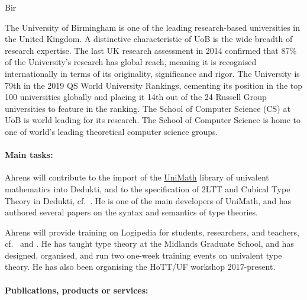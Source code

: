 \begin{sitedescription}{Bir}


The University of Birmingham is one of the leading research-based universities in the United Kingdom. A distinctive
characteristic of UoB is the wide breadth of research expertise. The last UK research assessment in 2014 confirmed that
87\% of the University’s research has global reach, meaning it is recognised internationally in terms of its originality, significance and rigor. The University is 79th in the 2019 QS World University Rankings, cementing its position in the top 100 universities globally and placing it 14th out of the 24 Russell Group universities to feature in the ranking. The School of Computer Science (CS) at UoB is world leading for its research. 
The School of Computer Science is home to one of world's leading theoretical computer science groups.

\paragraph*{Main tasks:}

\begin{compactitem}
\item Ahrens will contribute to the import of the \href{https://github.com/UniMath/UniMath}{UniMath} library of univalent mathematics into Dedukti, and to the specification of 2LTT and Cubical Type Theory in Dedukti, cf.\ . He is one of the main developers of UniMath, and has authored several papers on the syntax and semantics of type theories.
\item Ahrens will provide training on Logipedia for students, researchers, and teachers, cf.\  and .
He has taught type theory at the Midlands Graduate School, and has designed, organised, and run two one-week training events on univalent type theory. He has also been organising the HoTT/UF workshop 2017-present.

\end{compactitem}

\paragraph*{Publications, products or services:}


\end{sitedescription}
